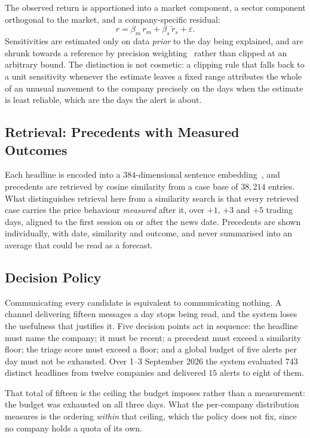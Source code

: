 \documentclass[runningheads]{llncs}
\begin{document}
The observed return is apportioned into a market component, a sector component orthogonal
to the market, and a company-specific residual:
\begin{equation}
r = \beta_m\, r_m + \beta_s\, \tilde{r}_s + \varepsilon .
\label{eq:decomp}
\end{equation}
Sensitivities are estimated only on data \emph{prior} to the day being explained, and are
shrunk towards a reference by precision weighting~\cite{vasicek1973beta} rather than
clipped at an arbitrary bound. The distinction is not cosmetic: a clipping rule that falls
back to a unit sensitivity whenever the estimate leaves a fixed range attributes the whole
of an unusual movement to the company precisely on the days when the estimate is least
reliable, which are the days the alert is about.

\subsection{Retrieval: Precedents with Measured Outcomes}

Each headline is encoded into a $384$-dimensional sentence
embedding~\cite{reimers2019sbert}, and precedents are retrieved by cosine similarity from a
case base of $38{,}214$ entries. What distinguishes retrieval here from a similarity search
is that every retrieved case carries the price behaviour \emph{measured} after it, over
$+1$, $+3$ and $+5$ trading days, aligned to the first session on or after the news date.
Precedents are shown individually, with date, similarity and outcome, and never summarised
into an average that could be read as a forecast.

\subsection{Decision Policy}

Communicating every candidate is equivalent to communicating nothing. A channel delivering
fifteen messages a day stops being read, and the system loses the usefulness that justifies
it. Five decision points act in sequence: the headline must name the company; it must be
recent; a precedent must exceed a similarity floor; the triage score must exceed a floor;
and a global budget of five alerts per day must not be exhausted. Over 1--3 September 2026
the system evaluated $743$ distinct headlines from twelve companies and delivered $15$
alerts to eight of them.

That total of fifteen is the ceiling the budget imposes rather than a measurement: the
budget was exhausted on all three days. What the per-company distribution measures is the
ordering \emph{within} that ceiling, which the policy does not fix, since no company holds
a quota of its own.
\end{document}
